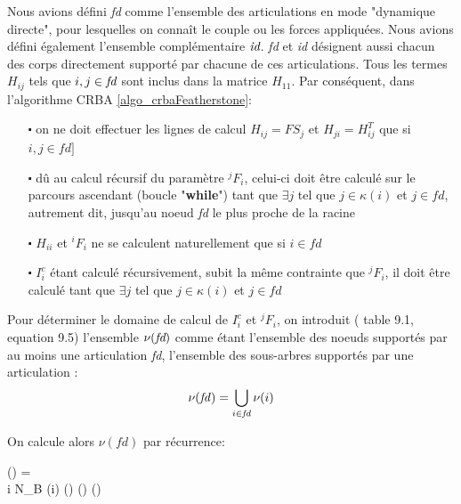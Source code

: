 \documentclass{report}
\begin{document}
Nous avions défini \emph{fd} comme l'ensemble des articulations en mode "dynamique directe", \cad pour lesquelles on connaît le couple ou les forces appliquées. Nous avions défini également l'ensemble complémentaire $\emph{id}$. \emph{fd} et \emph{id} désignent aussi chacun des corps directement supporté par chacune de ces articulations. Tous les termes $H_{ij}$ tels que $i,j \in \emph{fd}$ sont inclus dans la matrice $H_{11}$. Par conséquent, dans l'algorithme CRBA \ref{algo_crbaFeatherstone}: \\
\begin{itemize}
\item[$\centerdot$] on ne doit effectuer les lignes de calcul $H_{ij} = F S_j$ et $H_{ji} = H_{ij}^T$ que si $i,j \in \mathit{fd}]$
\item[$\centerdot$] dû au calcul récursif du paramètre $^jF_i$, celui-ci doit être calculé sur le parcours ascendant (boucle "\textbf{while}") tant que $\exists j$ tel que $j \in \kappa(i)$ et $j \in \mathit{fd}$, autrement dit, jusqu'au noeud \emph{fd} le plus proche de la racine\footnotemark[1]
\item[$\centerdot$] $H_{ii}$ et $^iF_i$ ne se calculent naturellement que si $i \in \mathit{fd}$
\item[$\centerdot$] $I_i^c$ étant calculé récursivement, subit la même contrainte que $^jF_i$, il doit être calculé tant que $\exists j$ tel que $j \in \kappa(i)$ et $j \in \mathit{fd}$\footnotemark[1]
\end{itemize}

\medskip
Pour déterminer le domaine de calcul de $I_i^c$ et $^jF_i$, on introduit (\cite{bib_featherstone} table 9.1, equation 9.5) l'ensemble $\nu(\emph{fd})$ comme étant l'ensemble des noeuds supportés par au moins une articulation \emph{fd}, \cad l'ensemble des sous-arbres supportés par une articulation \fd:
\begin{equation}
\nu(\mathit{fd}) = \bigcup_{i \in \mathit{fd}}\nu(i)
\end{equation}

\begin{minipage}[c]{0.5\textwidth}
\end{minipage}
\begin{minipage}[c]{0.5\textwidth}
    On calcule alors $\nu(fd)$ par récurrence:
    \begin{spacing}{1.5}
	  \begin{pseudocode}[display]{}{}
    \nu(\mfd) = \mfd \\
		\FOR i  \TO N_B \DO
		\BEGIN
		  \IF \lambda(i) \in \nu(\mfd)
		  \THEN
		    \nu(\mfd) \GETS \nu(\mfd) 
		\END
    \end{pseudocode}
    \end{spacing}
\end{minipage}
\end{document}
